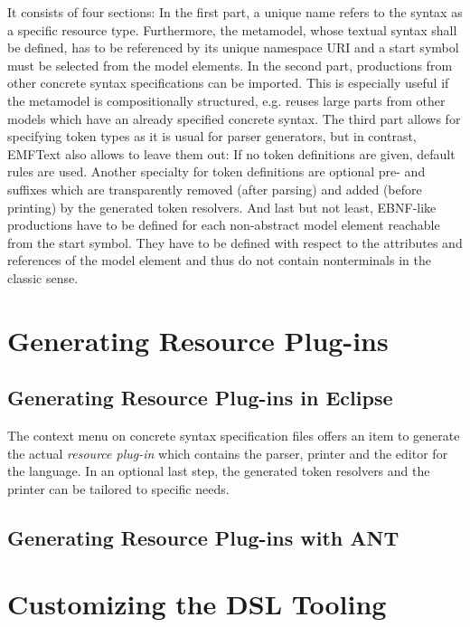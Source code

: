 It consists of four sections: In the first part, a unique
name refers to the syntax as a specific resource type. Furthermore, the metamodel, 
whose textual syntax shall be defined, has 
to be referenced by its  unique namespace URI and a start symbol must be selected from 
the model elements. In the second part, productions from other concrete syntax 
specifications can be imported. This is especially useful if the metamodel is 
compositionally structured, e.g. reuses large parts from other models which have an 
already specified concrete syntax.  The third part allows for specifying token types as
 it is usual for parser generators, but in contrast, EMFText also allows to leave them 
 out: If no token definitions are given, default rules are used. Another specialty for 
 token definitions are optional pre- and suffixes which are transparently removed (after 
 parsing) and added (before printing) by the generated token resolvers. And last but 
 not least, EBNF-like productions have to be defined for each non-abstract model element 
 reachable from the start symbol. They have to be defined with respect to the attributes 
 and references of the model element and thus do not contain nonterminals in the classic 
 sense.

\section{Generating Resource Plug-ins}

\subsection{Generating Resource Plug-ins in Eclipse}

The context menu on concrete syntax specification files offers an item to generate the 
actual \emph{resource plug-in} which contains the parser, printer and the editor
for the language. In an optional last step, the generated token resolvers and the printer 
can be tailored to specific needs.

\subsection{Generating Resource Plug-ins with ANT}

\section{Customizing the DSL Tooling}

